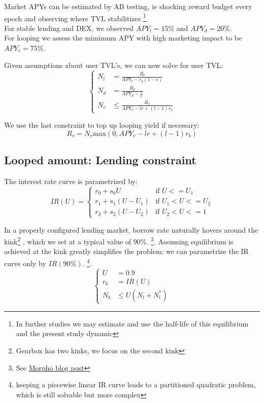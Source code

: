 \documentclass{article}
\begin{document}
    Market APYs can be estimated by AB testing, ie shocking reward budget every epoch and observing where TVL stabilitizes 
    \footnote{In further studies we may estimate and use the half-life of this equilibrium and the present study dynamic}. \\
    For stable lending and DEX, we observed $APY_l=15\%$ and $APY_d=20\%$. \\
    For looping we assess the mimimum APY with high marketing impact to be $APY_v=75\%$.

    Given assumptions about user TVL's, we can now solve for user TVL:
    \begin{equation}
    \left\{
    \begin{aligned}
        N_l &= \frac{R_l}{APY_l - r_b(1-\epsilon)}\\
        N_d &= \frac{R_d}{APY_d - \frac{r}{2}}\\
        N_v &\leq \frac{R_v}{APY_v - lr + (l-1)r_b}
    \end{aligned}
    \right.
    \label{eq:user_tvl_relationships}
    \end{equation}

We use the last constraint to top up looping yield if necessary:
\begin{equation}
R_v = N_v \text{max}(0, APY_v - lr + (l-1)r_b)
\end{equation}

    \subsection{Looped amount: Lending constraint}
    The interest rate curve is parametrized by:
    \begin{equation*}
        IR(U) = \begin{cases}
        r_0+s_0 U & \text{if } U<=U_1\\
        r_1+s_1 (U-U_1) & \text{if } U_1<U<=U_2\\
        r_2+s_2 (U-U_2) & \text{if } U_2<U<=1
        \end{cases}
    \end{equation*}
    
    In a properly configured lending market, borrow rate naturally hovers around the kink\footnote{Gearbox has two kinks, we focus on the second kink}
    , which we set at a typical value of $90\%$.
    \footnote{See \href{https://morpho.org/blog/introducing-the-adaptivecurveirm-efficient-and-autonomous}{Morpho blog post}}.
    Assuming equilibrium is achieved at the kink greatly simplifies the problem: we can parametrize the IR curve only by $IR(90\%)$. 
    \footnote{keeping a piecewise linear IR curve leads to a partitioned quadratic problem, which is still solvable but more complex}.
    \begin{equation*}
        \left\{
        \begin{aligned}
            U &= 0.9\\
            r_b &= IR(U)\\
            N_b &\leq U(N_l+N_l^*)
        \end{aligned}
        \right.
    \end{equation*}
\end{document}
